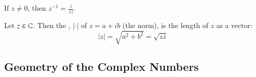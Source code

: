 \documentclass[12pt, a4paper, oneside, openright, titlepage]{book}
\begin{document}
\begin{prop}
    If $z \neq 0$, then $z^{-1} = \frac{\overline{z}}{z\overline{z}}$.
\end{prop}


\begin{defn}
    Let $z \in \mathbb C$. Then the , $|\cdot |$ of $z=a+ib$ (the norm), is the length of $z$ as a vector: \begin{equation*}
        |z| = \sqrt{a^2+b^2} = \sqrt{z\overline{z}}
    \end{equation*}
\end{defn}


\subsection{Geometry of the Complex Numbers}
\end{document}
